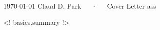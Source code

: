 \documentclass[11pt, a4paper]{awesome-cv}
\begin{document}
\makecvheader

\makecvfooter
  {\today}
  {Claud D. Park~~~·~~~Cover Letter}
  {ass}

\makelettertitle

\begin{cvletter}

<! basics.summary !>
\end{cvletter}


\makeletterclosing
\end{document}
